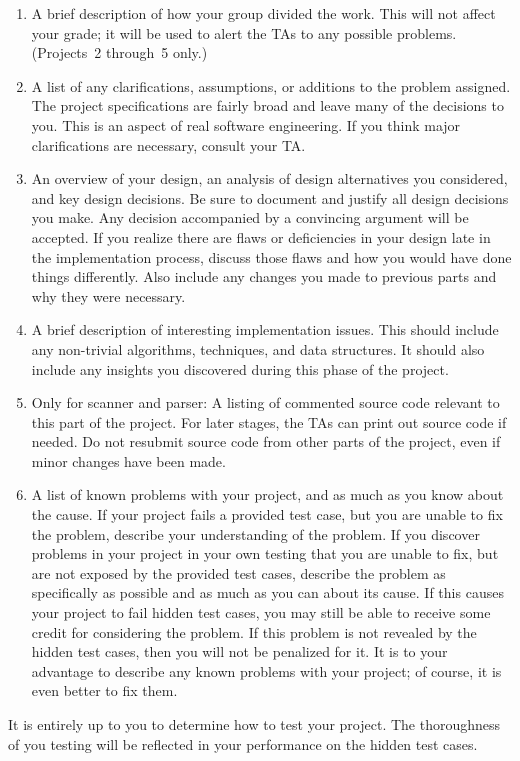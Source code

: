 \begin{enumerate}

\item A brief description of how your group divided the work.  This
will not affect your grade; it will be used to alert the TAs to any
possible problems. (Projects~2 through~5 only.)

\item A list of any clarifications, assumptions, or additions to the
problem assigned.  The project specifications are fairly broad and
leave many of the decisions to you.  This is an aspect of real
software engineering.  If you think major clarifications are
necessary, consult your TA.

\item An overview of your design, an analysis of design alternatives
you considered, and key design decisions.  Be sure to document and
justify all design decisions you make.  Any decision accompanied by a
convincing argument will be accepted.  If you realize there are flaws
or deficiencies in your design late in the implementation process,
discuss those flaws and how you would have done things differently.
Also include any changes you made to previous parts and why they were
necessary.

\item A brief description of interesting implementation issues. This
should include any non-trivial algorithms, techniques, and data
structures. It should also include any insights you discovered during
this phase of the project.

\item Only for scanner and parser: A listing of commented source code
relevant to this part of the project.  For later stages, the TAs can
print out source code if needed.  Do not resubmit source code from
other parts of the project, even if minor changes have been made.

\item A list of known problems with your project, and as much as you
know about the cause.  If your project fails a provided test case, but
you are unable to fix the problem, describe your understanding of the
problem.  If you discover problems in your project in your own testing
that you are unable to fix, but are not exposed by the provided test
cases, describe the problem as specifically as possible and as much as
you can about its cause.  If this causes your project to fail hidden
test cases, you may still be able to receive some credit for
considering the problem.  If this problem is not revealed by the
hidden test cases, then you will not be penalized for it.  It is to
your advantage to describe any known problems with your project; of
course, it is even better to fix them.

\end{enumerate}

It is entirely up to you to determine how to test your project.  The
thoroughness of you testing will be reflected in your performance on
the hidden test cases.


